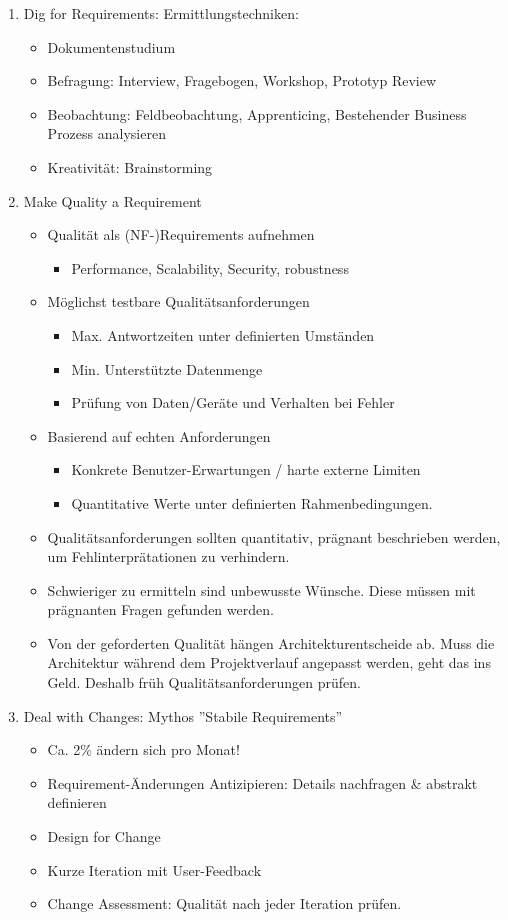 \begin{enumerate}
	\item Dig for Requirements: Ermittlungstechniken: 
		\begin{itemize}
			\item Dokumentenstudium
			\item Befragung: Interview, Fragebogen, Workshop, Prototyp Review
			\item Beobachtung: Feldbeobachtung, Apprenticing, Bestehender Business Prozess analysieren
			\item Kreativität: Brainstorming
		\end{itemize}
	\item Make Quality a Requirement
		\begin{itemize}
			\item Qualität als (NF-)Requirements aufnehmen
				\begin{itemize}
					\item Performance, Scalability, Security, robustness
				\end{itemize}
			\item Möglichst testbare Qualitätsanforderungen
				\begin{itemize}
					\item Max. Antwortzeiten unter definierten Umständen
					\item Min. Unterstützte Datenmenge
					\item Prüfung von Daten/Geräte und Verhalten bei Fehler
				\end{itemize}
			\item Basierend auf echten Anforderungen
				\begin{itemize}
					\item Konkrete Benutzer-Erwartungen / harte externe Limiten
					\item Quantitative Werte unter definierten Rahmenbedingungen.
				\end{itemize}
			\item Qualitätsanforderungen sollten quantitativ, prägnant beschrieben werden, um Fehlinterprätationen zu verhindern.
			\item Schwieriger zu ermitteln sind unbewusste Wünsche. Diese müssen mit prägnanten Fragen gefunden werden.
			\item Von der geforderten Qualität hängen Architekturentscheide ab. Muss die Architektur während dem Projektverlauf angepasst werden, geht das ins Geld. Deshalb früh Qualitätsanforderungen prüfen.
		\end{itemize}
	\item Deal with Changes: Mythos ''Stabile Requirements''
		\begin{itemize}
			\item Ca. 2\% ändern sich pro Monat!
			\item Requirement-Änderungen Antizipieren: Details nachfragen \& abstrakt definieren
			\item Design for Change
			\item Kurze Iteration mit User-Feedback
			\item Change Assessment: Qualität nach jeder Iteration prüfen.
		\end{itemize}
\end{enumerate}


